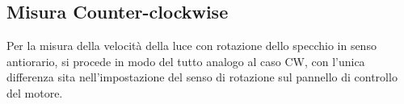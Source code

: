 \subsection{Misura Counter-clockwise}
Per la misura della velocità della luce con rotazione dello specchio in senso antiorario, si procede in modo del tutto analogo al caso CW, con l'unica differenza sita nell'impostazione del senso di rotazione sul pannello di controllo del motore.
